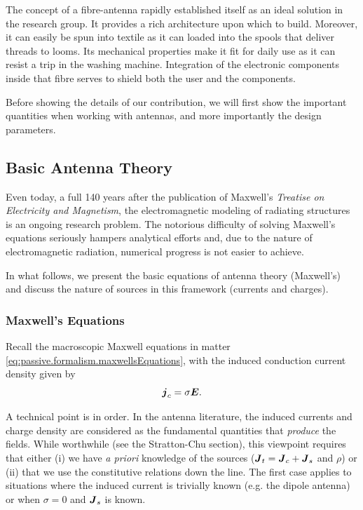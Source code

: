 The concept of a fibre-antenna rapidly established itself
as an ideal solution in the research group. It provides a rich
architecture upon which to build. Moreover, it can easily 
be spun into textile as it can loaded into the spools that 
deliver threads to looms. Its mechanical properties make it
fit for daily use as it can resist a trip in the washing machine. 
Integration of the electronic components inside that fibre 
serves to shield both the user and the components. 

Before showing the details of our contribution, 
we will first show the important quantities when
working with antennas, and more importantly the design
parameters.

\subsection{Basic Antenna Theory}
Even today, a full 140 years after the publication of 
Maxwell's \textit{Treatise on Electricity and Magnetism}, 
the electromagnetic modeling of radiating structures 
is an ongoing research problem. The notorious difficulty 
of solving Maxwell's equations seriously hampers analytical efforts
and, due to the nature of electromagnetic radiation, numerical
progress is not easier to achieve.

In what follows, we present the basic equations of 
antenna theory (Maxwell's) and discuss the nature 
of sources in this framework (currents and charges). 

\subsubsection{Maxwell's Equations}
Recall the macroscopic Maxwell equations in matter
\eqref{eq:passive.formalism.maxwellsEquations}, with the 
induced conduction current density given by
	\begin{equation}
		\boldsymbol{j}_c = \sigma\boldsymbol{E}.
	\end{equation}


A technical point is in order. In the antenna literature, the induced
currents and charge density are considered as the fundamental quantities 
that \textit{produce} the fields. While worthwhile (see the Stratton-Chu section), 
this viewpoint requires that either (i) we have \textit{a priori} knowledge of 
the sources ($\boldsymbol{J}_t=\boldsymbol{J}_c+\boldsymbol{J}_s$ and $\rho$) or (ii) that we use the
constitutive relations down the line. The first case applies to situations
where the induced current is trivially known (e.g. the dipole antenna) or
when $\sigma=0$ and $\boldsymbol{J}_s$ is known.

